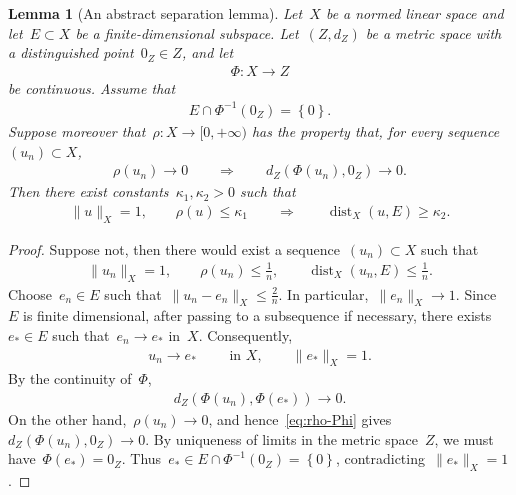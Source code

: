 \documentclass[10pt,a4paper]{amsart}
\newcommand{\braces}[1]{\left\{#1\right\}} %
\DeclareMathOperator{\dist}{dist}
\newtheorem{lemma}[thm]{Lemma}
\begin{document}
\begin{lemma}[An abstract separation lemma]\label{lemma:abstract-separation}
    Let~$X$ be a normed linear space and let~$E\subset X$ be a finite-dimensional subspace.
    Let~$(Z,d_Z)$ be a metric space with a distinguished point~$0_Z\in Z$, and let
    \begin{align}
        \Phi\colon X\to Z
    \end{align}
    be continuous.
    Assume that
    \begin{align}\label{eq:trivial-intersection}
        E\cap \Phi^{-1}(0_Z)=\braces{0}.
    \end{align}
    Suppose moreover that~$\rho\colon X\to[0,+\infty)$ has the property that, for every sequence~$(u_n)\subset X$,
    \begin{align}\label{eq:rho-Phi}
        \rho(u_n)\to0
        \qquad\Longrightarrow\qquad
        d_Z(\Phi(u_n),0_Z)\to0.
    \end{align}
    Then there exist constants~$\kappa_1,\kappa_2>0$ such that
    \begin{align}\label{eq:abstract-separation}
        \|u\|_X=1,
        \qquad
        \rho(u)\leq\kappa_1
        \qquad\Longrightarrow\qquad
        \dist_X(u,E)\geq\kappa_2.
    \end{align}
\end{lemma}

\begin{proof}
    Suppose not, then there would exist a sequence~$(u_n)\subset X$ such that
    \begin{align}
        \|u_n\|_X=1,
        \qquad
        \rho(u_n)\leq\frac{1}{n},
        \qquad
        \dist_X(u_n,E)\leq\frac{1}{n}.
    \end{align}
    Choose~$e_n\in E$ such that~$\|u_n-e_n\|_X\leq \frac{2}{n}$. 
    In particular,~$\|e_n\|_X\to1$. 
    Since~$E$ is finite dimensional, after passing to a subsequence if necessary, there exists~$e_*\in E$ such that~$e_n\to e_*$ in~$X$. 
    Consequently,
    \begin{align}
        u_n\to e_*
        \qquad\mbox{ in }X,
        \qquad
        \|e_*\|_X=1.
    \end{align}
    By the continuity of~$\Phi$,
    \begin{align}
        d_Z(\Phi(u_n),\Phi(e_*))\to0.
    \end{align}
    On the other hand,~$\rho(u_n)\to0$, and hence~\eqref{eq:rho-Phi} gives~$ d_Z(\Phi(u_n),0_Z)\to0$. 
    By uniqueness of limits in the metric space~$Z$, we must have~$\Phi(e_*)=0_Z$. 
    Thus~$e_*\in E\cap\Phi^{-1}(0_Z)=\braces{0}$, contradicting~$\|e_*\|_X=1$.
\end{proof}
\end{document}
